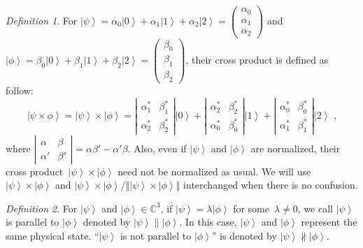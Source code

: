 \documentclass[12pt]{iopart}
\theoremstyle{remark}
\newtheorem{definition}{Definition}
\newcommand{\ket}[1]{{\left\vert{#1}\right\rangle}}
\begin{document}
\begin{definition}For $\ket{\psi}=\alpha_{0}\ket{0}+\alpha_{1}\ket{1}+\alpha_{2}\ket{2}=\left(\begin{array}{c}\alpha_{0}\\
\alpha_{1}\\
\alpha_{2}
\end{array}\right)$ and $\ket{\phi}=\beta_{0}\ket{0}+\beta_{1}\ket{1}+\beta_{2}\ket{2}=\left(\begin{array}{c}\beta_{0}\\
\beta_{1}\\
\beta_{2}
\end{array}\right)$, their cross product is defined as follow: 
\begin{equation}
\ket{\psi\times\phi}=\ket{\psi}\times\ket{\phi}=\left|\begin{array}{cc}\alpha_{1}^{*} & \beta_{1}^{*}\\
\alpha_{2}^{*} & \beta_{2}^{*}
\end{array}\right|\ket{0}+\left|\begin{array}{cc}\alpha_{2}^{*} & \beta_{2}^{*}\\
\alpha_{0}^{*} & \beta_{0}^{*}
\end{array}\right|\ket{1}+\left|\begin{array}{cc}\alpha_{0}^{*} & \beta_{0}^{*}\\
\alpha_{1}^{*} & \beta_{1}^{*}
\end{array}\right|\ket{2}\textrm{ ,}
\end{equation}
where $\left|\begin{array}{cc}\alpha & \beta\\
\alpha' & \beta'
\end{array}\right|=\alpha\beta'-\alpha'\beta$. Also, even if $\ket{\psi}$ and $\ket{\phi}$ are normalized, their
cross product~$\ket{\psi}\times\ket{\phi}$ need not be normalized
as usual. We will use $\ket{\psi}\times\ket{\phi}$ and
$\ket{\psi}\times\ket{\phi}/\left\Vert
\ket{\psi}\times\ket{\phi}\right\Vert$ interchanged when there is no
confusion.\end{definition}

\begin{definition}For $\ket{\psi}$ and $\ket{\phi}\in\mathbb{C}^{3}$,
if $\ket{\psi}=\lambda\ket{\phi}$ for some~$\lambda\ne0$, we call
$\ket{\psi}$ is parallel to $\ket{\phi}$ denoted by $\ket{\psi}\parallel\ket{\phi}$.
In this case, $\ket{\psi}$ and $\ket{\phi}$ represent the same physical
state. ``$\ket{\psi}$ is not parallel to $\ket{\phi}$'' is denoted
by $\ket{\psi}\nparallel\ket{\phi}$.\end{definition}
\end{document}
